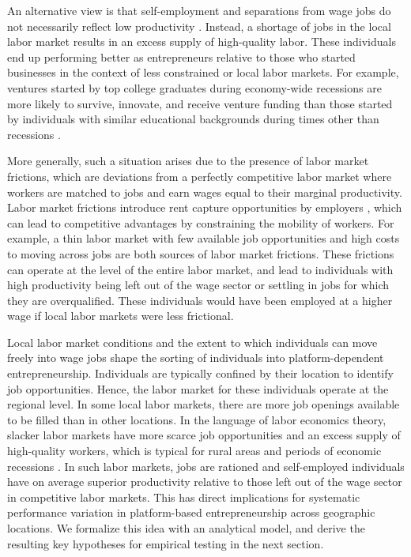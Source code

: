 \documentclass[letterpaper,12pt]{article}
\begin{document}
An alternative view is that self-employment and separations from wage jobs do not necessarily reflect low productivity \citep{yagan_employment_2019,koch_career_2021}. Instead, a shortage of jobs in the local labor market results in an excess supply of high-quality labor. These individuals end up performing better as entrepreneurs relative to those who started businesses in the context of less constrained or local labor markets. For example, ventures started by top college graduates during economy-wide recessions are more likely to survive, innovate, and receive venture funding than those started by individuals with similar educational backgrounds during times other than recessions \citep{hacamo_forced_2022}. 

More generally, such a situation arises due to the presence of labor market frictions, which are deviations from a perfectly competitive labor market where workers are matched to jobs and earn wages equal to their marginal productivity. Labor market frictions introduce rent capture opportunities by employers \citep{mahoney_market_2013,campbell_bridging_2017}, which can lead to competitive advantages by constraining the mobility of workers. For example, a thin labor market with few available job opportunities and high costs to moving across jobs \citep{campbell_bridging_2017} are both sources of labor market frictions. These frictions can operate at the level of the entire labor market, and lead to individuals with high productivity being left out of the wage sector or settling in jobs for which they are overqualified. These individuals would have been employed at a higher wage if local labor markets were less frictional. 


Local labor market conditions and the extent to which individuals can move freely into wage jobs shape the sorting of individuals into platform-dependent entrepreneurship. Individuals are typically confined by their location to identify job opportunities. Hence, the labor market for these individuals operate at the regional level. In some local labor markets, there are more job openings available to be filled than in other locations. In the language of labor economics theory, slacker labor markets have more scarce job opportunities and an excess supply of high-quality workers, which is typical for rural areas \citep{breza_labor_2021} and periods of economic recessions \citep{michaillat_matching_2012}. In such labor markets, jobs are rationed and self-employed individuals have on average superior productivity relative to those left out of the wage sector in competitive labor markets. This has direct implications for systematic performance variation in platform-based entrepreneurship across geographic locations. We formalize this idea with an analytical model, and derive the resulting key hypotheses for empirical testing in the next section.
\end{document}

